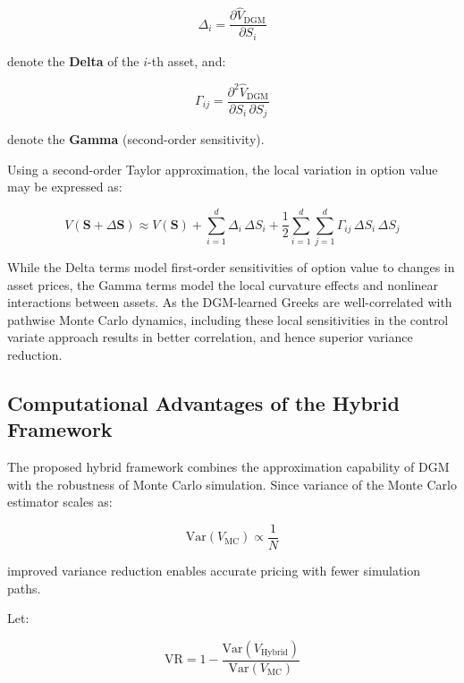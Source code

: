 \documentclass[12pt, a4paper]{article}
\begin{document}
\begin{equation}
    \Delta_i = \frac{\partial\hat{V}_{\mathrm{DGM}}}{\partial S_i}
    \label{eq:delta_dgm}
\end{equation}

denote the \textbf{Delta} of the $i$-th asset, and:

\begin{equation}
    \Gamma_{ij} = \frac{\partial^2\hat{V}_{\mathrm{DGM}}}
                       {\partial S_i\,\partial S_j}
    \label{eq:gamma_dgm}
\end{equation}

denote the \textbf{Gamma} (second-order sensitivity).

Using a second-order Taylor approximation, the local variation in
option value may be expressed as:

\begin{equation}
    V(\mathbf{S} + \Delta\mathbf{S})
    \approx V(\mathbf{S})
    + \sum_{i=1}^{d} \Delta_i\,\Delta S_i
    + \frac{1}{2}\sum_{i=1}^{d}\sum_{j=1}^{d}
      \Gamma_{ij}\,\Delta S_i\,\Delta S_j
    \label{eq:taylor_expansion}
\end{equation}

While the Delta terms model first-order sensitivities of option value
to changes in asset prices, the Gamma terms model the local curvature
effects and nonlinear interactions between assets. As the DGM-learned
Greeks are well-correlated with pathwise Monte Carlo dynamics, including
these local sensitivities in the control variate approach results in
better correlation, and hence superior variance reduction.

\subsection{Computational Advantages of the Hybrid Framework}

The proposed hybrid framework combines the approximation capability of
DGM with the robustness of Monte Carlo simulation. Since variance of
the Monte Carlo estimator scales as:

\[
    \mathrm{Var}(V_{\mathrm{MC}}) \propto \frac{1}{N}
\]

improved variance reduction enables accurate pricing with fewer
simulation paths.

Let:

\begin{equation}
    \mathrm{VR} = 1 - \frac{\mathrm{Var}(V_{\mathrm{Hybrid}})}
                            {\mathrm{Var}(V_{\mathrm{MC}})}
    \label{eq:vr_ratio}
\end{equation}
\end{document}

